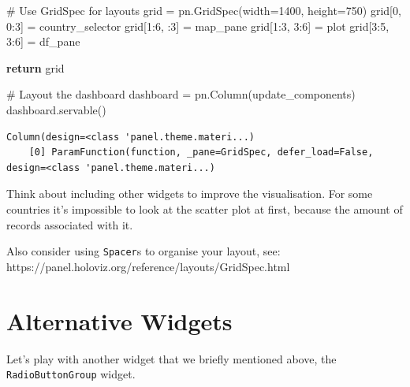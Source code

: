 \documentclass[
  letterpaper,
  DIV=11,
  numbers=noendperiod]{scrreprt}
\newenvironment{Shaded}{\begin{snugshade}}{\end{snugshade}}
\newcommand{\CommentTok}[1]{\textcolor[rgb]{0.37,0.37,0.37}{#1}}
\newcommand{\ControlFlowTok}[1]{\textcolor[rgb]{0.00,0.23,0.31}{\textbf{#1}}}
\newcommand{\DecValTok}[1]{\textcolor[rgb]{0.68,0.00,0.00}{#1}}
\newcommand{\NormalTok}[1]{\textcolor[rgb]{0.00,0.23,0.31}{#1}}
\newcommand{\OperatorTok}[1]{\textcolor[rgb]{0.37,0.37,0.37}{#1}}
\begin{document}
\begin{Shaded}
\begin{Highlighting}[]
    \CommentTok{\# Use GridSpec for layouts}
\NormalTok{    grid }\OperatorTok{=}\NormalTok{ pn.GridSpec(width}\OperatorTok{=}\DecValTok{1400}\NormalTok{, height}\OperatorTok{=}\DecValTok{750}\NormalTok{)}
\NormalTok{    grid[}\DecValTok{0}\NormalTok{, }\DecValTok{0}\NormalTok{:}\DecValTok{3}\NormalTok{] }\OperatorTok{=}\NormalTok{ country\_selector}
\NormalTok{    grid[}\DecValTok{1}\NormalTok{:}\DecValTok{6}\NormalTok{, :}\DecValTok{3}\NormalTok{] }\OperatorTok{=}\NormalTok{ map\_pane}
\NormalTok{    grid[}\DecValTok{1}\NormalTok{:}\DecValTok{3}\NormalTok{, }\DecValTok{3}\NormalTok{:}\DecValTok{6}\NormalTok{] }\OperatorTok{=}\NormalTok{ plot}
\NormalTok{    grid[}\DecValTok{3}\NormalTok{:}\DecValTok{5}\NormalTok{, }\DecValTok{3}\NormalTok{:}\DecValTok{6}\NormalTok{] }\OperatorTok{=}\NormalTok{ df\_pane}
    
    \ControlFlowTok{return}\NormalTok{ grid}

\CommentTok{\# Layout the dashboard}
\NormalTok{dashboard }\OperatorTok{=}\NormalTok{ pn.Column(update\_components)}
\NormalTok{dashboard.servable()}
\end{Highlighting}
\end{Shaded}

\begin{verbatim}
Column(design=<class 'panel.theme.materi...)
    [0] ParamFunction(function, _pane=GridSpec, defer_load=False, design=<class 'panel.theme.materi...)
\end{verbatim}

Think about including other widgets to improve the visualisation. For
some countries it's impossible to look at the scatter plot at first,
because the amount of records associated with it.

Also consider using \texttt{Spacer}s to organise your layout, see:
https://panel.holoviz.org/reference/layouts/GridSpec.html

\section{Alternative Widgets}\label{alternative-widgets}

Let's play with another widget that we briefly mentioned above, the
\texttt{RadioButtonGroup} widget.
\end{document}
